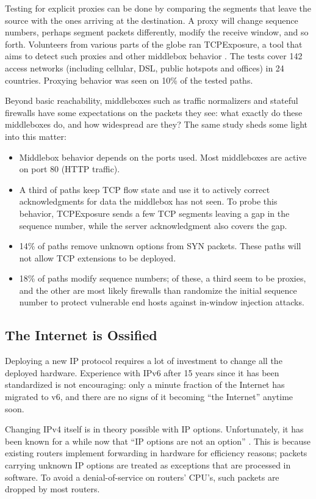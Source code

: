 Testing for explicit proxies can be done by comparing the segments that leave the source with the ones arriving at the destination.
A proxy will change sequence numbers, perhaps segment packets differently, modify the receive window, and so forth. Volunteers 
from various parts of the globe ran TCPExposure, a tool that aims to detect such proxies and other middlebox behavior 
\cite{honda2011still}. The tests cover 142 access networks (including cellular, DSL, public hotspots and offices) in 
24 countries. Proxying behavior was seen on 10\% of the tested paths\cite{honda2011still}. 

Beyond basic reachability, middleboxes such as traffic normalizers and stateful firewalls have some expectations on the packets they see: what exactly do these middleboxes do, and how widespread are they? The same study sheds some light into
this matter:
\begin{itemize}
\item Middlebox behavior depends on the ports used. Most middleboxes are active on port 80 (HTTP traffic).
\item A third of paths keep TCP flow state and use it to actively correct acknowledgments for data the middlebox has not
seen. To probe this behavior, TCPExposure sends a few TCP segments leaving a gap in the sequence number, while the server
acknowledgment also covers the gap. 
\item 14\% of paths remove unknown options from SYN packets. These paths will not allow TCP extensions to be deployed.
\item 18\% of paths modify sequence numbers; of these, a third seem to be proxies, and the other are most likely
firewalls than randomize the initial sequence number to protect vulnerable end hosts against in-window injection attacks.
\end{itemize}
 

\subsection{The Internet is Ossified}

Deploying a new IP protocol requires a lot of investment to change all the deployed hardware. Experience
with IPv6 after 15 years since it has been standardized is not encouraging: only a minute fraction of the Internet has
migrated to v6, and there are no signs of it becoming ``the Internet'' anytime soon. 

Changing IPv4 itself is in theory possible with IP options. Unfortunately, it has been known for a while now
that ``IP options are not an option'' \cite{fonseca2005ip}. This is because existing routers implement forwarding in hardware 
for efficiency reasons; packets carrying unknown IP options are treated as exceptions that are processed in software.
To avoid a denial-of-service on routers' CPU's, such packets are dropped by most routers. 

